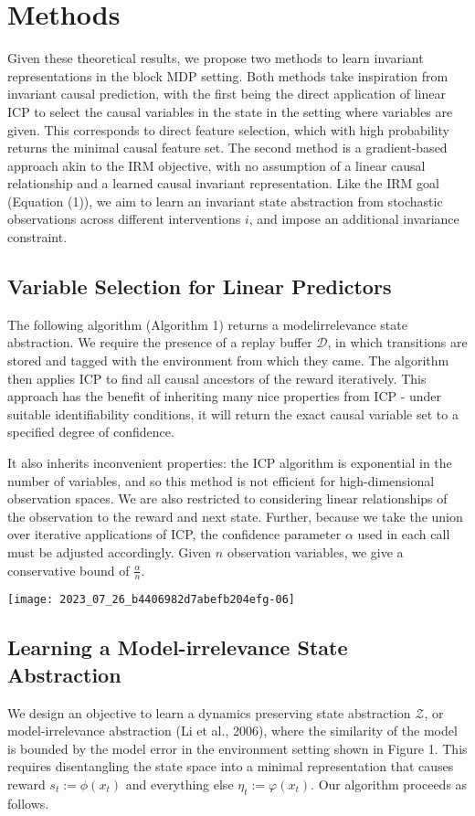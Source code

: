\documentclass[10pt]{article}
\begin{document}
\section{Methods}
Given these theoretical results, we propose two methods to learn invariant representations in the block MDP setting. Both methods take inspiration from invariant causal prediction, with the first being the direct application of linear ICP to select the causal variables in the state in the setting where variables are given. This corresponds to direct feature selection, which with high probability returns the minimal causal feature set. The second method is a gradient-based approach akin to the IRM objective, with no assumption of a linear causal relationship and a learned causal invariant representation. Like the IRM goal (Equation (1)), we aim to learn an invariant state abstraction from stochastic observations across different interventions $i$, and impose an additional invariance constraint.

\subsection{Variable Selection for Linear Predictors}
The following algorithm (Algorithm 1) returns a modelirrelevance state abstraction. We require the presence of a replay buffer $\mathcal{D}$, in which transitions are stored and tagged with the environment from which they came. The algorithm then applies ICP to find all causal ancestors of the reward iteratively. This approach has the benefit of inheriting many nice properties from ICP - under suitable identifiability conditions, it will return the exact causal variable set to a specified degree of confidence.

It also inherits inconvenient properties: the ICP algorithm is exponential in the number of variables, and so this method is not efficient for high-dimensional observation spaces. We are also restricted to considering linear relationships of the observation to the reward and next state. Further, because we take the union over iterative applications of ICP, the confidence parameter $\alpha$ used in each call must be adjusted accordingly. Given $n$ observation variables, we give a conservative bound of $\frac{\alpha}{n}$.

\begin{center}
\texttt{[image: 2023\_07\_26\_b4406982d7abefb204efg-06]}
\end{center}

\subsection{Learning a Model-irrelevance State Abstraction}
We design an objective to learn a dynamics preserving state abstraction $\mathcal{Z}$, or model-irrelevance abstraction (Li et al., 2006), where the similarity of the model is bounded by the model error in the environment setting shown in Figure 1. This requires disentangling the state space into a minimal representation that causes reward $s_{t}:=\phi\left(x_{t}\right)$ and everything else $\eta_{t}:=\varphi\left(x_{t}\right)$. Our algorithm proceeds as follows.
\end{document}
